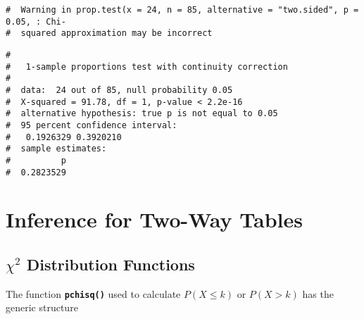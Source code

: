 \documentclass[letterpaper,12pt,twoside,]{pinp}
\begin{document}
\begin{Shaded}
\begin{Highlighting}[]
\NormalTok{(} \NormalTok{, } \NormalTok{, } \NormalTok{, } \NormalTok{, } \NormalTok{)}
\end{Highlighting}
\end{Shaded}

\begin{ShadedResult}
\begin{verbatim}
#  Warning in prop.test(x = 24, n = 85, alternative = "two.sided", p = 0.05, : Chi-
#  squared approximation may be incorrect
\end{verbatim}
\end{ShadedResult}
\begin{ShadedResult}
\begin{verbatim}
#  
#   1-sample proportions test with continuity correction
#  
#  data:  24 out of 85, null probability 0.05
#  X-squared = 91.78, df = 1, p-value < 2.2e-16
#  alternative hypothesis: true p is not equal to 0.05
#  95 percent confidence interval:
#   0.1926329 0.3920210
#  sample estimates:
#          p 
#  0.2823529
\end{verbatim}
\end{ShadedResult}

\newpage

\hypertarget{inference-for-two-way-tables}{%
\section{Inference for Two-Way
Tables}\label{inference-for-two-way-tables}}

\hypertarget{chi2-distribution-functions}{%
\subsection{\texorpdfstring{\(\chi^2\) Distribution
Functions}{\textbackslash chi\^{}2 Distribution Functions}}\label{chi2-distribution-functions}}

The function \textbf{\texttt{pchisq()}} used to calculate
\(P(X \leq k)\) or \(P(X > k)\) has the generic structure

\begin{Shaded}
\begin{Highlighting}[]
 \NormalTok{)}
\end{Highlighting}
\end{Shaded}
\end{document}
